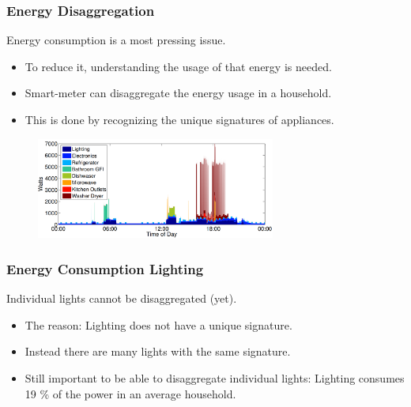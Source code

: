 \documentclass{beamer}
\begin{document}
	\begin{frame}\frametitle{Energy Disaggregation}

		Energy consumption is a most pressing issue.

		\begin{itemize}

			\item To reduce it, understanding the usage of that energy is needed.

			\item Smart-meter can disaggregate the energy usage in a household.

			\item This is done by recognizing the unique signatures of appliances.

		\end{itemize}

		\begin{figure}[t]
			\centering
			\includegraphics[width=0.7\textwidth]{../chapters/introduction-chapters/energy-consumption-house.png}
		\end{figure}


	\end{frame}






	\begin{frame}\frametitle{Energy Consumption Lighting}

		Individual lights cannot be disaggregated (yet).

		\begin{itemize}

			\item The reason: Lighting does not have a unique signature. %

			\item Instead there are many lights with the same signature.

			\item Still important to be able to disaggregate individual lights: Lighting consumes 19 \% of the power in an average household.

		\end{itemize}


	\end{frame}
\end{document}

